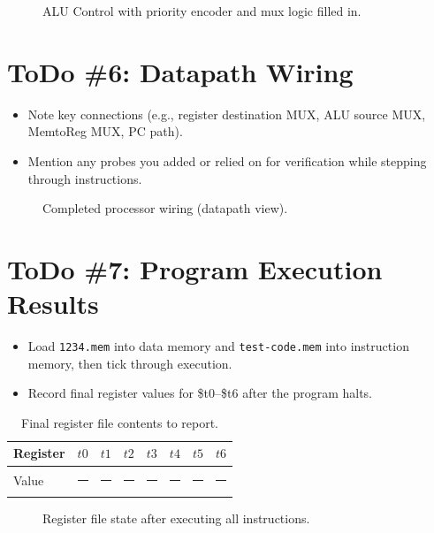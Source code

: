 \documentclass[11pt]{article}
\newcommand{\fillin}{\rule{2.5em}{0.4pt}}
\begin{document}
\begin{figure}[h]
  \centering
  \caption{ALU Control with priority encoder and mux logic filled in.}
\end{figure}

\section{ToDo \#6: Datapath Wiring}
\begin{itemize}[leftmargin=*]
  \item Note key connections (e.g., register destination MUX, ALU source MUX, MemtoReg MUX, PC path).
  \item Mention any probes you added or relied on for verification while stepping through instructions.
\end{itemize}

\begin{figure}[h]
  \centering
  \caption{Completed processor wiring (datapath view).}
\end{figure}

\section{ToDo \#7: Program Execution Results}
\begin{itemize}[leftmargin=*]
  \item Load \texttt{1234.mem} into data memory and \texttt{test-code.mem} into instruction memory, then tick through execution.
  \item Record final register values for \$t0--\$t6 after the program halts.
\end{itemize}

\begin{table}[h]
  \centering
  \caption{Final register file contents to report.}
  \begin{tabular}{lccccccc}
    \toprule
    Register & $t0$ & $t1$ & $t2$ & $t3$ & $t4$ & $t5$ & $t6$ \\
    \midrule
    Value & \fillin & \fillin & \fillin & \fillin & \fillin & \fillin & \fillin \\
    \bottomrule
  \end{tabular}
\end{table}

\begin{figure}[h]
  \centering
  \caption{Register file state after executing all instructions.}
\end{figure}
\end{document}
